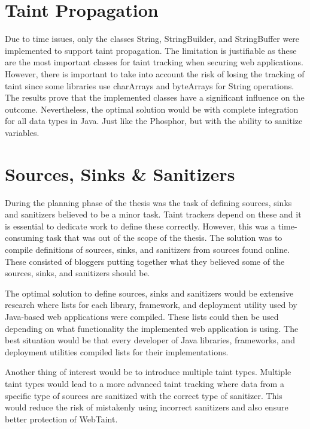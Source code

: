 \section{Taint Propagation}
\label{propagation}
Due to time issues, only the classes String, StringBuilder, and StringBuffer were implemented to support taint propagation. The limitation is justifiable as these are the most important classes for taint tracking when securing web applications. However, there is important to take into account the risk of losing the tracking of taint since some libraries use charArrays and byteArrays for String operations. The results prove that the implemented classes have a significant influence on the outcome. Nevertheless, the optimal solution would be with complete integration for all data types in Java. Just like the Phosphor, but with the ability to sanitize variables.



\section{Sources, Sinks \& Sanitizers}
\label{sss}
During the planning phase of the thesis was the task of defining sources, sinks and sanitizers believed to be a minor task. Taint trackers depend on these and it is essential to dedicate work to define these correctly. However, this was a time-consuming task that was out of the scope of the thesis. The solution was to compile definitions of sources, sinks, and sanitizers from sources found online. These consisted of bloggers putting together what they believed some of the sources, sinks, and sanitizers should be.

The optimal solution to define sources, sinks and sanitizers would be extensive research where lists for each library, framework, and deployment utility used by Java-based web applications were compiled. These lists could then be used depending on what functionality the implemented web application is using. The best situation would be that every developer of Java libraries, frameworks, and deployment utilities compiled lists for their implementations.

Another thing of interest would be to introduce multiple taint types. Multiple taint types would lead to a more advanced taint tracking where data from a specific type of sources are sanitized with the correct type of sanitizer. This would reduce the risk of mistakenly using incorrect sanitizers and also ensure better protection of WebTaint.



